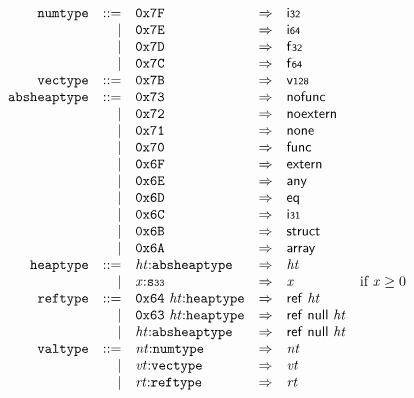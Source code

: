 \vspace{1ex}

$$
\begin{array}{@{}l@{}rrlll@{}l@{}}
& {\mathtt{numtype}} &::=& \mathtt{0x7F} &\Rightarrow& \mathsf{i{\scriptstyle32}} \\ &&|&
\mathtt{0x7E} &\Rightarrow& \mathsf{i{\scriptstyle64}} \\ &&|&
\mathtt{0x7D} &\Rightarrow& \mathsf{f{\scriptstyle32}} \\ &&|&
\mathtt{0x7C} &\Rightarrow& \mathsf{f{\scriptstyle64}} \\
& {\mathtt{vectype}} &::=& \mathtt{0x7B} &\Rightarrow& \mathsf{v{\scriptstyle128}} \\
& {\mathtt{absheaptype}} &::=& \mathtt{0x73} &\Rightarrow& \mathsf{nofunc} \\ &&|&
\mathtt{0x72} &\Rightarrow& \mathsf{noextern} \\ &&|&
\mathtt{0x71} &\Rightarrow& \mathsf{none} \\ &&|&
\mathtt{0x70} &\Rightarrow& \mathsf{func} \\ &&|&
\mathtt{0x6F} &\Rightarrow& \mathsf{extern} \\ &&|&
\mathtt{0x6E} &\Rightarrow& \mathsf{any} \\ &&|&
\mathtt{0x6D} &\Rightarrow& \mathsf{eq} \\ &&|&
\mathtt{0x6C} &\Rightarrow& \mathsf{i{\scriptstyle31}} \\ &&|&
\mathtt{0x6B} &\Rightarrow& \mathsf{struct} \\ &&|&
\mathtt{0x6A} &\Rightarrow& \mathsf{array} \\
& {\mathtt{heaptype}} &::=& {\mathit{ht}}{:}{\mathtt{absheaptype}} &\Rightarrow& {\mathit{ht}} \\ &&|&
{{\mathit{x}}}{:}{\mathtt{s{\scriptstyle33}}} &\Rightarrow& {{\mathit{x}}} &\quad
  \mbox{if}~{{\mathit{x}}} \geq 0 \\
& {\mathtt{reftype}} &::=& \mathtt{0x64}~{\mathit{ht}}{:}{\mathtt{heaptype}} &\Rightarrow& \mathsf{ref}~{\mathit{ht}} \\ &&|&
\mathtt{0x63}~{\mathit{ht}}{:}{\mathtt{heaptype}} &\Rightarrow& \mathsf{ref}~\mathsf{null}~{\mathit{ht}} \\ &&|&
{\mathit{ht}}{:}{\mathtt{absheaptype}} &\Rightarrow& \mathsf{ref}~\mathsf{null}~{\mathit{ht}} \\
& {\mathtt{valtype}} &::=& {\mathit{nt}}{:}{\mathtt{numtype}} &\Rightarrow& {\mathit{nt}} \\ &&|&
{\mathit{vt}}{:}{\mathtt{vectype}} &\Rightarrow& {\mathit{vt}} \\ &&|&
{\mathit{rt}}{:}{\mathtt{reftype}} &\Rightarrow& {\mathit{rt}} \\
\end{array}
$$

